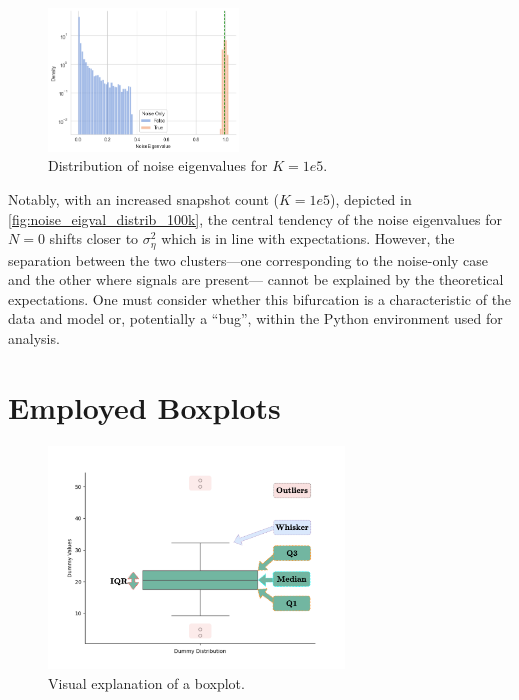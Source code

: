 \begin{figure}[H]
    \centering
    \includegraphics[width=0.45\textwidth]{figures/04_ModelOrderEstimation/noise_eigval_distrib_100k.png}
    \caption{Distribution of noise eigenvalues for \( K = 1e5 \).}
    \label{fig:noise_eigval_distrib_100k}
\end{figure}
Notably, with an increased snapshot count (\( K = 1e5 \)), depicted in \autoref{fig:noise_eigval_distrib_100k}, the
central tendency of the noise eigenvalues for \( N = 0 \) shifts closer to \( \sigma^2_\eta \) which is
in line with expectations. However, the separation between the two clusters—one corresponding to the noise-only case and
the other where signals are present— cannot be explained by the theoretical expectations.
One must consider whether this bifurcation is a characteristic of the data and model or, potentially a ``bug'', within
the Python environment used for analysis.


\section{Employed Boxplots}
\label{app:sec:Boxplot}

\begin{figure}[H]
    \centering
    \includegraphics[width=0.7\textwidth]{figures/Appendix/boxplot.pdf}
    \caption{Visual explanation of a boxplot.}
    \label{fig:boxplot}
\end{figure}

